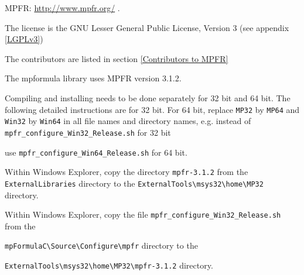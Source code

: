 MPFR: \href{http://www.mpfr.org/}{http://www.mpfr.org/} . 

The license is the GNU Lesser General Public License, Version 3 (see appendix \ref{LGPLv3})

The contributors are listed in section \ref{Contributors to MPFR}

The mpformula library uses MPFR version 3.1.2.


\vpara
Compiling and installing needs to be done separately for 32 bit and 64 bit. The following detailed instructions are for 32 bit. For 64 bit, replace \verb|MP32| by \verb|MP64| and \verb|Win32| by  \verb|Win64| in all file names and directory names, e.g. instead of \verb|mpfr_configure_Win32_Release.sh| for 32 bit

use \verb|mpfr_configure_Win64_Release.sh| for 64 bit.

\vpara
Within Windows Explorer, copy the directory \verb|mpfr-3.1.2|  from the \verb|ExternalLibraries|
directory to the \verb|ExternalTools\msys32\home\MP32| directory. 

\vpara
Within Windows Explorer, copy the file \verb|mpfr_configure_Win32_Release.sh|  from the

\verb|mpFormulaC\Source\Configure\mpfr| directory to the 

\verb|ExternalTools\msys32\home\MP32\mpfr-3.1.2| directory.  



